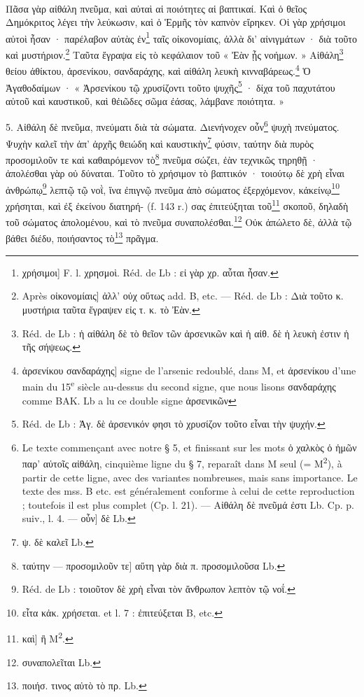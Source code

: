 \documentclass[landscape, a4paper, 11pt, oneside, polutonikogreek, french]{article}
\begin{document}
\paragraph{}
Πᾶσα γὰρ αἰθάλη πνεῦμα, καὶ αὐταὶ αἱ ποιότητες αἱ βαπτικαί. Καὶ ὁ θεῖος Δημόκριτος λέγει τὴν λεύκωσιν, καὶ ὁ Ἑρμῆς τὸν καπνὸν εἴρηκεν. Οἱ γὰρ χρήσιμοι αὐτοὶ ἦσαν · παρέλαβον αὐτὰς ἐν\footnote{χρήσιμοι] F. l. χρησμοὶ. Réd. de Lb : εἰ γὰρ χρ. αὗται ἦσαν.} ταῖς οἰκονομίαις, ἀλλὰ δι' αἰνιγμάτων · διὰ τοῦτο καὶ μυστήριον.\footnote{Après οἰκονομίαις] ἀλλ' οὐχ οὕτως add. B, etc. --- Réd. de Lb : Διὰ τοῦτο κ. μυστήρια ταῦτα ἔγραψεν εἰς τ. κ. τὸ Ἐὰν.} Ταῦτα ἔγραψα εἰς τὸ κεφάλαιον τοῦ « Ἐὰν ᾖς νοήμων. » Αἰθάλη\footnote{Réd. de Lb : ἡ αἰθάλη δὲ τὸ θεῖον τῶν ἀρσενικῶν καὶ ἡ αἰθ. δὲ ἡ λευκὴ ἐστιν ἡ τῆς σήψεως.} θείου ἀθίκτου, ἀρσενίκου, σανδαράχης, καὶ αἰθάλη λευκὴ κινναβάρεως.\footnote{ἀρσενίκου σανδαράχης] signe de l'arsenic redoublé, dans M, et ἀρσενίκου d'une main du 15\textsuperscript{e} siècle au-dessus du second signe, que nous lisons σανδαράχης comme BAK. Lb a lu ce double signe ἀρσενικῶν} Ὁ Ἀγαθοδαίμων · « Ἀρσενίκου τῷ χρυσίζοντι τοῦτο ψυχῆς\footnote{Réd. de Lb : Ἀγ. δὲ ἀρσενικόν φησι τὸ χρυσίζον τοῦτο εἶναι τὴν ψυχήν.} · δίχα τοῦ παχυτάτου αὐτοῦ καὶ καυστικοῦ, καὶ θἐιῶδες σῶμα ἐάσας, λάμβανε ποιότητα. »

5. Αἰθάλη δὲ πνεῦμα, πνεύματι διὰ τὰ σώματα. Διενήνοχεν οὖν\footnote{Le texte commençant avec notre § 5, et finissant sur les mots ὁ χαλκὸς ὁ ἡμῶν παρ' αὐτοῖς αἰθάλη, cinquième ligne du § 7, reparaît dans M seul (= M\textsuperscript{2}), à partir de cette ligne, avec des variantes nombreuses, mais sans importance. Le texte des mss. B etc. est généralement conforme à celui de cette reproduction ; toutefois il est plus complet (Cp. l. 21). --- Αἰθάλη δὲ πνεῦμά ἐστι Lb. Cp. p. suiv., l. 4. --- οὖν] δὲ Lb.} ψυχὴ πνεύματος. Ψυχὴν καλεῖ τὴν ἀπ' ἀρχῆς θειώδη καὶ καυστικὴν\footnote{ψ. δὲ καλεῖ Lb.} φύσιν, ταύτην διὰ πυρὸς προσομιλοῦν τε καὶ καθαιρόμενον τὸ\footnote{ταύτην --- προσομιλοῦν τε] αὕτη γὰρ διὰ π. προσομιλοῦσα Lb.} πνεῦμα σώζει, ἐὰν τεχνικῶς τηρηθῇ · ἀπολέσθαι γὰρ οὐ δύναται. Τοῦτο τὸ χρήσιμον τὸ βαπτικόν · τοιούτῳ δὲ χρὴ εἶναι ἀνθρώπῳ\footnote{Réd. de Lb : τοιοῦτον δὲ χρὴ εἶναι τὸν ἄνθρωπον λεπτὸν τῷ νοΐ.} λεπτῷ τῷ νοῒ, ἵνα ἐπιγνῷ πνεῦμα ἀπὸ σώματος ἐξερχόμενον, κἀκείνῳ\footnote{εἶτα κἀκ. χρήσεται. et l. 7 : ἐπιτεύξεται B, etc.} χρήσηται, καὶ ἐξ ἐκείνου διατηρή- (f. 143 r.) σας ἐπιτεύξηται τοῦ\footnote{καὶ] ἢ M\textsuperscript{2}.} σκοποῦ, δηλαδὴ τοῦ σώματος ἀπολομένου, καὶ τὸ πνεῦμα συναπολέσθαι.\footnote{συναπολεῖται Lb.} Οὐκ ἀπώλετο δὲ, ἀλλὰ τῷ βάθει διέδυ, ποιήσαντος τὸ\footnote{ποιήσ. τινος αὐτὸ τὸ πρ. Lb.} πρᾶγμα.
\end{document}

